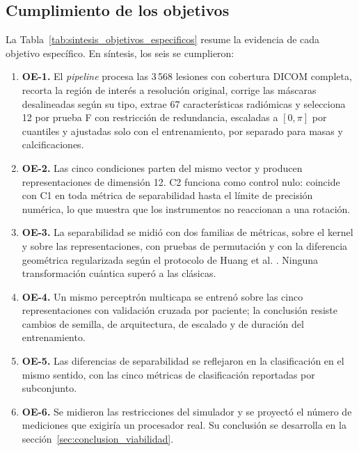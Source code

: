 
\subsection{Cumplimiento de los objetivos}
\label{sec:cumplimiento_objetivos}

La Tabla~\ref{tab:sintesis_objetivos_especificos} resume la evidencia de cada objetivo específico.
En síntesis, los seis se cumplieron:

\begin{enumerate}
  \item \textbf{OE-1.} El \textit{pipeline} procesa las 3\,568 lesiones con cobertura DICOM completa,
  recorta la región de interés a resolución original, corrige las máscaras desalineadas según su tipo,
  extrae 67 características radiómicas y selecciona 12 por prueba F con restricción de redundancia,
  escaladas a $[0,\pi]$ por cuantiles y ajustadas solo con el entrenamiento, por separado para masas y
  calcificaciones.
  \item \textbf{OE-2.} Las cinco condiciones parten del mismo vector y producen representaciones de
  dimensión 12. C2 funciona como control nulo: coincide con C1 en toda métrica de separabilidad hasta
  el límite de precisión numérica, lo que muestra que los instrumentos no reaccionan a una rotación.
  \item \textbf{OE-3.} La separabilidad se midió con dos familias de métricas, sobre el kernel y sobre
  las representaciones, con pruebas de permutación y con la diferencia geométrica regularizada según el
  protocolo de Huang et al. \cite{huang2021power}. Ninguna transformación cuántica superó a las
  clásicas.
  \item \textbf{OE-4.} Un mismo perceptrón multicapa se entrenó sobre las cinco representaciones con
  validación cruzada por paciente; la conclusión resiste cambios de semilla, de arquitectura, de
  escalado y de duración del entrenamiento.
  \item \textbf{OE-5.} Las diferencias de separabilidad se reflejaron en la clasificación en el mismo
  sentido, con las cinco métricas de clasificación reportadas por subconjunto.
  \item \textbf{OE-6.} Se midieron las restricciones del simulador y se proyectó el número de
  mediciones que exigiría un procesador real. Su conclusión se desarrolla en la
  sección~\ref{sec:conclusion_viabilidad}.
\end{enumerate}
